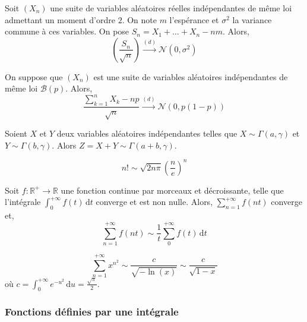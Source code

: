 
	\begin{theorem}
		Soit $(X_n)$ une suite de variables aléatoires réelles indépendantes de même loi admettant un moment d'ordre $2$. On note $m$ l'espérance et $\sigma^2$ la variance commune à ces variables. On pose $S_n = X_1 + \dots + X_n - nm$. Alors,
		\[ \left ( \frac{S_n}{\sqrt{n}} \right) \overset{(d)}{\longrightarrow} \mathcal{N}(0, \sigma^2) \]
	\end{theorem}

	\begin{application}
		On suppose que $(X_n)$ est une suite de variables aléatoires indépendantes de même loi $\mathcal{B}(p)$. Alors,
		\[ \frac{\sum_{k=1}^{n} X_k - np}{\sqrt{n}} \overset{(d)}{\longrightarrow} \mathcal{N}(0, p(1-p)) \]
	\end{application}


	\begin{lemma}
		Soient $X$ et $Y$ deux variables aléatoires indépendantes telles que $X \sim \Gamma(a, \gamma)$ et $Y \sim \Gamma(b, \gamma)$. Alors $Z = X + Y \sim \Gamma(a+b, \gamma)$.
	\end{lemma}


	\begin{application}
		\[ n! \sim \sqrt{2n\pi} \left(\frac{n}{e} \right)^n \]
	\end{application}


	\begin{proposition}
		Soit $f : \mathbb{R}^+ \rightarrow \mathbb{R}$ une fonction continue par morceaux et décroissante, telle que l'intégrale $\int_0^{+\infty} f(t) \, \mathrm{d}t$ converge et est non nulle. Alors, $\sum_{n=1}^{+\infty} f(nt)$ converge et,
		\[ \sum_{n=1}^{+\infty} f(nt) \sim \frac{1}{t} \sum_0^{+\infty} f(t) \, \mathrm{d}t \]
	\end{proposition}

	\begin{example}
		\[ \sum_{n=1}^{+\infty} x^{n^2} \sim \frac{c}{\sqrt{-\ln(x)}} \sim \frac{c}{\sqrt{1-x}} \]
		où $c = \int_0^{+\infty} e^{-u^2} \, \mathrm{d}u = \frac{\sqrt{\pi}}{2}$.
	\end{example}

	\subsubsection{Fonctions définies par une intégrale}

